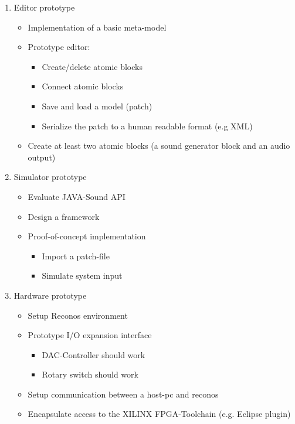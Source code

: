 \begin{enumerate}
	\item Editor prototype
		\begin{itemize}
			\item Implementation of a basic meta-model
			\item Prototype editor:
				\begin{itemize}
					\item Create/delete atomic blocks
					\item Connect atomic blocks
					\item Save and load a model (patch)
					\item Serialize the patch to a human readable format (e.g XML)
				\end{itemize}
			\item Create at least two atomic blocks (a sound generator block and an audio output)
		\end{itemize}
	\item Simulator prototype
		\begin{itemize}
			\item Evaluate JAVA-Sound API
			\item Design a framework
			\item Proof-of-concept implementation
			\begin{itemize}
				\item Import a patch-file
				\item Simulate system input
			\end{itemize}
		\end{itemize}
	\item Hardware prototype
		\begin{itemize}
			\item Setup Reconos environment
			\item Prototype I/O expansion interface
			\begin{itemize}
				\item DAC-Controller should work
				\item Rotary switch should work
			\end{itemize}
			\item Setup communication between a host-pc and reconos
			\item Encapsulate access to the XILINX FPGA-Toolchain (e.g. Eclipse plugin)
		\end{itemize}
\end{enumerate}


